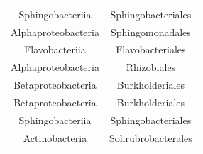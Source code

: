 \documentclass[]{article}
\begin{document}
\begin{longtable}[]{@{}cc@{}}
\begin{minipage}[t]{0.39\columnwidth}
Sphingobacteriia\strut
\end{minipage} & \begin{minipage}[t]{0.44\columnwidth}\centering
Sphingobacteriales\strut
\end{minipage}\tabularnewline
\begin{minipage}[t]{0.39\columnwidth}\centering
Alphaproteobacteria\strut
\end{minipage} & \begin{minipage}[t]{0.44\columnwidth}\centering
Sphingomonadales\strut
\end{minipage}\tabularnewline
\begin{minipage}[t]{0.39\columnwidth}\centering
Flavobacteriia\strut
\end{minipage} & \begin{minipage}[t]{0.44\columnwidth}\centering
Flavobacteriales\strut
\end{minipage}\tabularnewline
\begin{minipage}[t]{0.39\columnwidth}\centering
Alphaproteobacteria\strut
\end{minipage} & \begin{minipage}[t]{0.44\columnwidth}\centering
Rhizobiales\strut
\end{minipage}\tabularnewline
\begin{minipage}[t]{0.39\columnwidth}\centering
Betaproteobacteria\strut
\end{minipage} & \begin{minipage}[t]{0.44\columnwidth}\centering
Burkholderiales\strut
\end{minipage}\tabularnewline
\begin{minipage}[t]{0.39\columnwidth}\centering
Betaproteobacteria\strut
\end{minipage} & \begin{minipage}[t]{0.44\columnwidth}\centering
Burkholderiales\strut
\end{minipage}\tabularnewline
\begin{minipage}[t]{0.39\columnwidth}\centering
Sphingobacteriia\strut
\end{minipage} & \begin{minipage}[t]{0.44\columnwidth}\centering
Sphingobacteriales\strut
\end{minipage}\tabularnewline
\begin{minipage}[t]{0.39\columnwidth}\centering
Actinobacteria\strut
\end{minipage} & \begin{minipage}[t]{0.44\columnwidth}\centering
Solirubrobacterales\strut
\end{minipage}\tabularnewline
\bottomrule
\end{longtable}
\end{document}
